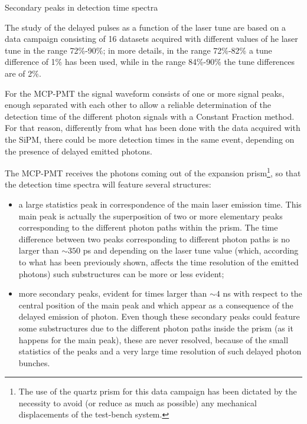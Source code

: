 \documentclass[a4paper,11pt]{article}
\begin{document}
\begin{subsection}{Secondary peaks in detection time spectra}

The study of the delayed pulses as a function of the laser tune are based on a data campaign consisting of 16 datasets acquired with different values of he laser tune in the range 72\%-90\%; in more details, in the range 72\%-82\% a tune difference of 1\% has been used, while in the range 84\%-90\% the tune differences are of 2\%. 


For the MCP-PMT the signal waveform consists of one or more signal peaks, enough separated with each other to allow a reliable determination of the detection time of the different photon signals with a Constant Fraction method. For that reason, differently from what has been done with the data acquired with the SiPM, there could be more detection times in the same event, depending on the presence of delayed emitted photons.

The MCP-PMT receives the photons coming out of the expansion prism\footnote{The use of the quartz prism for this data campaign has been dictated by the necessity to avoid (or reduce as much as possible) any mechanical displacements of the test-bench system.}, so that the detection time spectra will feature several structures: 
\begin{itemize}
\item a large statistics peak in correspondence of the main laser emission time. This main peak is actually the superposition of two or more elementary peaks corresponding to the different photon paths within the prism. The time difference between two peaks corresponding to different photon paths is no larger than $\sim 350$ ps and depending on the laser tune value (which, according to what has been previously shown, affects the time resolution of the emitted photons) such substructures can be more or less evident;
\item more secondary peaks, evident for times larger than $\sim 4$ ns with respect to the central position of the main peak and which appear as a consequence of the delayed emission of photon. Even though these secondary peaks could feature some substructures due to the different photon paths inside the prism (as it happens for the main peak), these are never resolved, because of the small statistics of the peaks and a very large time resolution of such delayed photon bunches.
\end{itemize}






\end{subsection}
\end{document}
